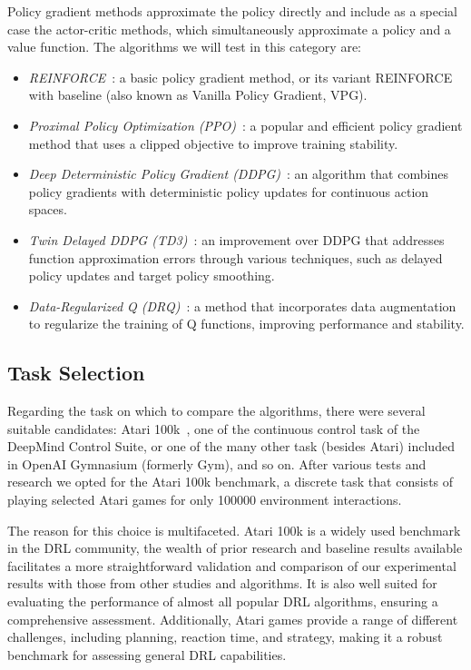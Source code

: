 Policy gradient methods approximate the policy directly and include as a special case the actor-critic methods, which simultaneously approximate a policy and a value function. The algorithms we will test in this category are:
\begin{itemize}
	\item \textit{REINFORCE}~\cite[Chapter~13]{sutton:rl}: a basic policy gradient method, or its variant REINFORCE with baseline (also known as Vanilla Policy Gradient, VPG).
	\item \textit{Proximal Policy Optimization (PPO)}~\cite{schulman:ppo}: a popular and efficient policy gradient method that uses a clipped objective to improve training stability.
	\item \textit{Deep Deterministic Policy Gradient (DDPG)}~\cite{lillicrap:ddpg}: an algorithm that combines policy gradients with deterministic policy updates for continuous action spaces.
	\item \textit{Twin Delayed DDPG (TD3)~}\cite{fujimoto:td3}: an improvement over DDPG that addresses function approximation errors through various techniques, such as delayed policy updates and target policy smoothing.
	\item \textit{Data-Regularized Q (DRQ)}~\cite{kostrikov:drq}: a method that incorporates data augmentation to regularize the training of Q functions, improving performance and stability.
\end{itemize}


\subsection{Task Selection}
\label{subsec:task_selection}

Regarding the task on which to compare the algorithms, there were several suitable candidates: Atari 100k~\cite{kaiser:atari100k}, one of the continuous control task of the DeepMind Control Suite, or one of the many other task (besides Atari) included in OpenAI Gymnasium (formerly Gym), and so on. After various tests and research we opted for the Atari 100k benchmark, a discrete task that consists of playing selected Atari games for only \num{100000} environment interactions.

The reason for this choice is multifaceted. Atari 100k is a widely used benchmark in the DRL community, the wealth of prior research and baseline results available facilitates a more straightforward validation and comparison of our experimental results with those from other studies and algorithms. It is also well suited for evaluating the performance of almost all popular DRL algorithms, ensuring a comprehensive assessment. Additionally, Atari games provide a range of different challenges, including planning, reaction time, and strategy, making it a robust benchmark for assessing general DRL capabilities.

